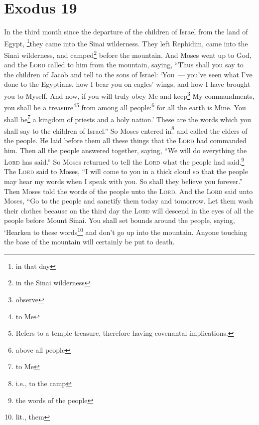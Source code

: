 \section{Exodus 19}\label{exodus:19}
\begin{enumerate}[align=center]
     In the third month since the departure of the children of Israel from the land of Egypt, \footnote{in that day}they came into the Sinai wilderness.%
     They left Rephidim, came into the Sinai wilderness, and camped\footnote{in the Sinai wilderness} before the mountain.%
     And Moses went up to God, and the \textsc{Lord} called to him from the mountain, saying, ``Thus shall you say to the children of Jacob and tell to the sons of Israel:%
     `You~--- you've seen what I've done to the Egyptians, how I bear you on eagles' wings, and how I have brought you to Myself.%
     And now, if you will truly obey Me and keep\footnote{observe} My commandments, you shall be a treasure\footnote{to Me}\footnote{Refers to a temple treasure, therefore having covenantal implications.} from among all people:\footnote{above all people} for all the earth is Mine.%
     You shall be\footnote{to Me} a kingdom of priests and a holy nation.' These are the words which you shall say to the children of Israel.''%
     So Moses entered in\footnote{i.e., to the camp} and called the elders of the people. He laid before them all these things that the \textsc{Lord} had commanded him.%
     Then all the people answered together, saying, ``We will do everything the \textsc{Lord} has said.'' So Moses returned to tell the \textsc{Lord} what the people had said.\footnote{the words of the people}%
     The \textsc{Lord} said to Moses, ``I will come to you in a thick cloud so that the people may hear my words when I speak with you. So shall they believe you forever.'' Then Moses told the words of the people unto the \textsc{Lord}.%
     And the \textsc{Lord} said unto Moses, ``Go to the people and sanctify them today and tomorrow. Let them wash their clothes%
     because on the third day the \textsc{Lord} will descend in the eyes of all the people before Mount Sinai.%
     You shall set bounds around the people, saying, `Hearken to these words\footnote{lit., them} and don't go up into the mountain. Anyone touching the base of the mountain will certainly be put to death.%

\end{enumerate}
